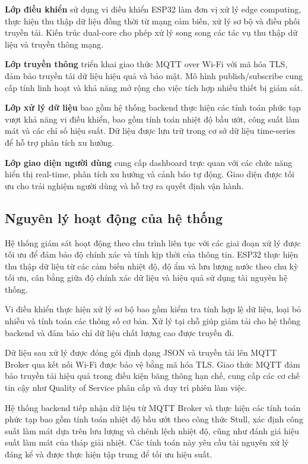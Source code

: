 \documentclass[../main.tex]{subfiles}
\begin{document}
\textbf{Lớp điều khiển} sử dụng vi điều khiển ESP32 làm đơn vị xử lý edge computing, thực hiện thu thập dữ liệu đồng thời từ mạng cảm biến, xử lý sơ bộ và điều phối truyền tải. Kiến trúc dual-core cho phép xử lý song song các tác vụ thu thập dữ liệu và truyền thông mạng.

\textbf{Lớp truyền thông} triển khai giao thức MQTT over Wi-Fi với mã hóa TLS, đảm bảo truyền tải dữ liệu hiệu quả và bảo mật. Mô hình publish/subscribe cung cấp tính linh hoạt và khả năng mở rộng cho việc tích hợp nhiều thiết bị giám sát.

\textbf{Lớp xử lý dữ liệu} bao gồm hệ thống backend thực hiện các tính toán phức tạp vượt khả năng vi điều khiển, bao gồm tính toán nhiệt độ bầu ướt, công suất làm mát và các chỉ số hiệu suất. Dữ liệu được lưu trữ trong cơ sở dữ liệu time-series để hỗ trợ phân tích xu hướng.

\textbf{Lớp giao diện người dùng} cung cấp dashboard trực quan với các chức năng hiển thị real-time, phân tích xu hướng và cảnh báo tự động. Giao diện được tối ưu cho trải nghiệm người dùng và hỗ trợ ra quyết định vận hành.

\subsection{Nguyên lý hoạt động của hệ thống}
\label{sec:system_operation_principle}

Hệ thống giám sát hoạt động theo chu trình liên tục với các giai đoạn xử lý được tối ưu để đảm bảo độ chính xác và tính kịp thời của thông tin. ESP32 thực hiện thu thập dữ liệu từ các cảm biến nhiệt độ, độ ẩm và lưu lượng nước theo chu kỳ tối ưu, cân bằng giữa độ chính xác dữ liệu và hiệu quả sử dụng tài nguyên hệ thống.

Vi điều khiển thực hiện xử lý sơ bộ bao gồm kiểm tra tính hợp lệ dữ liệu, loại bỏ nhiễu và tính toán các thông số cơ bản. Xử lý tại chỗ giúp giảm tải cho hệ thống backend và đảm bảo chỉ dữ liệu chất lượng cao được truyền đi.

Dữ liệu sau xử lý được đóng gói định dạng JSON và truyền tải lên MQTT Broker qua kết nối Wi-Fi được bảo vệ bằng mã hóa TLS. Giao thức MQTT đảm bảo truyền tải hiệu quả trong điều kiện băng thông hạn chế, cung cấp các cơ chế tin cậy như Quality of Service phân cấp và duy trì phiên làm việc.

Hệ thống backend tiếp nhận dữ liệu từ MQTT Broker và thực hiện các tính toán phức tạp bao gồm tính toán nhiệt độ bầu ướt theo công thức Stull, xác định công suất làm mát dựa trên lưu lượng và chênh lệch nhiệt độ, cũng như đánh giá hiệu suất làm mát của tháp giải nhiệt. Các tính toán này yêu cầu tài nguyên xử lý đáng kể và được thực hiện tập trung để tối ưu hiệu suất.
\end{document}
